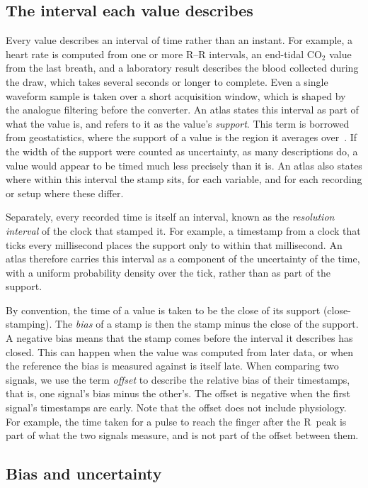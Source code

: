 \documentclass[11pt,a4paper]{article}
\begin{document}
\subsection{The interval each value describes}

Every value describes an interval of time rather than an instant. For example, a heart rate is computed from one or
more R--R intervals, an end-tidal CO$_2$ value from the last breath, and a laboratory result describes the blood
collected during the draw, which takes several seconds or longer to complete. Even a single waveform sample is taken
over a short acquisition window, which is shaped by the analogue filtering before the converter. An atlas states this
interval as part of what the value is, and refers to it as the value's \emph{support}. This term is borrowed from
geostatistics, where the support of a value is the region it averages over~\citep{gotway2002combining}. If the width
of the support were counted as uncertainty, as many descriptions do, a value would appear to be timed much less
precisely than it is. An atlas also states where within this interval the stamp sits, for each variable, and for each
recording or setup where these differ.

Separately, every recorded time is itself an interval, known as the \emph{resolution interval} of the clock that
stamped it. For example, a timestamp from a clock that ticks every millisecond places the support only to within that
millisecond. An atlas therefore carries this interval as a component of the uncertainty of the time, with a uniform
probability density over the tick, rather than as part of the support.

By convention, the time of a value is taken to be the close of its support (close-stamping). The \emph{bias} of a stamp
is then the stamp minus the close of the support. A negative bias means that the stamp comes before the interval it
describes has closed. This can happen when the value was computed from later data, or when the reference the bias is
measured against is itself late. When comparing two signals, we use the term \emph{offset} to describe the relative
bias of their timestamps, that is, one signal's bias minus the other's. The offset is negative when the first signal's
timestamps are early. Note that the offset does not include physiology. For example, the time taken for a pulse to
reach the finger after the R~peak is part of what the two signals measure, and is not part of the offset between them.

\subsection{Bias and uncertainty}
\label{sec:bias}
\end{document}
